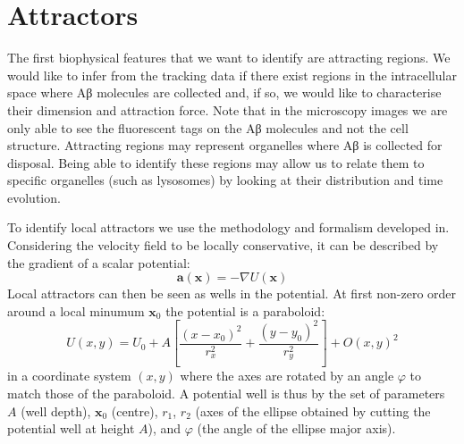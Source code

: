 %

\section{Attractors}\label{sec:attractors}

The first biophysical features that we want to identify are attracting regions. We would like to infer from the tracking data if there exist regions in the intracellular space where Aβ molecules are collected and, if so, we would like to characterise their dimension and attraction force. Note that in the microscopy images we are only able to see the fluorescent tags on the Aβ molecules and not the cell structure. Attracting regions may represent organelles where Aβ is collected for disposal. Being able to identify these regions may allow us to relate them to specific organelles (such as lysosomes) by looking at their distribution and time evolution.

To identify local attractors we use the methodology and formalism developed in. Considering the velocity field to be locally conservative, it can be described by the gradient of a scalar potential:
\begin{equation}
 \bm{a}(\bm{x}) = - \nabla U(\bm{x})
\end{equation}
Local attractors can then be seen as wells in the potential. At first non-zero order around a local minumum $\bm{x}_0$ the potential is a paraboloid:
\begin{equation} \label{eq:paraboloid}
 U(x, y) = U_0 + A\left[\frac{(x - x_0)^2}{r_x^2} + \frac{(y - y_0)^2}{r_y^2}\right] + O(x, y)^2
\end{equation}
in a coordinate system $(x, y)$ where the axes are rotated by an angle $\varphi$ to match those of the paraboloid. A potential well is thus by the set of parameters $A$ (well depth), $\bm{x}_0$ (centre), $r_1$, $r_2$ (axes of the ellipse obtained by cutting the potential well at height $A$), and $\varphi$ (the angle of the ellipse major axis).

